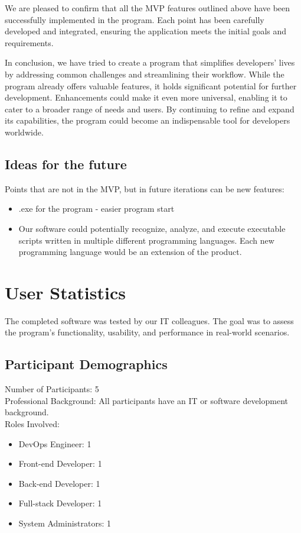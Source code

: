 \documentclass{article}
\begin{document}
We are pleased to confirm that all the MVP features outlined above have been successfully implemented in the program. Each point has been carefully developed and integrated, ensuring the application meets the initial goals and requirements.

In conclusion, we have tried to create a program that simplifies developers’ lives by addressing common challenges and streamlining their workflow. While the program already offers valuable features, it holds significant potential for further development. Enhancements could make it even more universal, enabling it to cater to a broader range of needs and users. By continuing to refine and expand its capabilities, the program could become an indispensable tool for developers worldwide.

\subsection{Ideas for the future}

Points that are not in the MVP, but in future iterations can be new features:
    \begin{itemize}
        \item .exe for the program - easier program start
        \item Our software could potentially recognize, analyze, and execute executable scripts written in multiple different programming languages. Each new programming language would be an extension of the product.
    \end{itemize}

\clearpage

\section{User Statistics}
The completed software was tested by our IT colleagues. The goal was to assess the program's functionality, usability, and performance in real-world scenarios.

\subsection{Participant Demographics}
Number of Participants: 5\\
Professional Background: All participants have an IT or software development background. \\
Roles Involved:
\begin{itemize}
    \item DevOps Engineer: 1
    \item Front-end Developer: 1
    \item Back-end Developer: 1
    \item Full-stack Developer: 1
    \item System Administrators: 1
\end{itemize}
\end{document}
